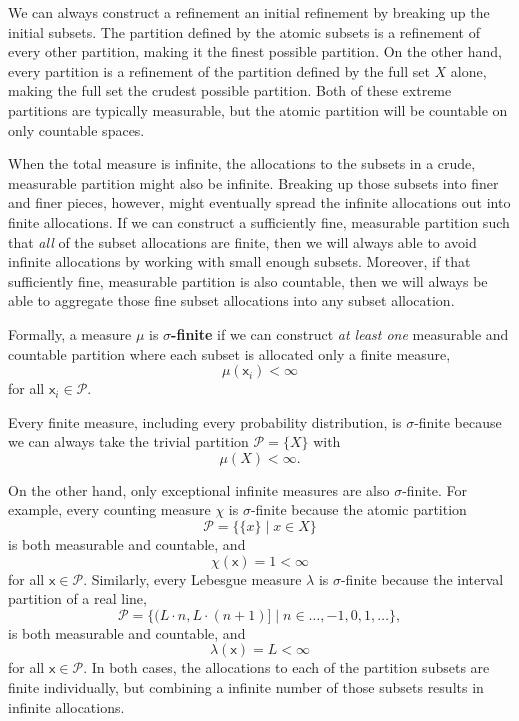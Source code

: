 \documentclass[
  letterpaper,
  DIV=11,
  numbers=noendperiod]{scrartcl}
\begin{document}
We can always construct a refinement an initial refinement by breaking
up the initial subsets. The partition defined by the atomic subsets is a
refinement of every other partition, making it the finest possible
partition. On the other hand, every partition is a refinement of the
partition defined by the full set \(X\) alone, making the full set the
crudest possible partition. Both of these extreme partitions are
typically measurable, but the atomic partition will be countable on only
countable spaces.

When the total measure is infinite, the allocations to the subsets in a
crude, measurable partition might also be infinite. Breaking up those
subsets into finer and finer pieces, however, might eventually spread
the infinite allocations out into finite allocations. If we can
construct a sufficiently fine, measurable partition such that \emph{all}
of the subset allocations are finite, then we will always able to avoid
infinite allocations by working with small enough subsets. Moreover, if
that sufficiently fine, measurable partition is also countable, then we
will always be able to aggregate those fine subset allocations into any
subset allocation.

Formally, a measure \(\mu\) is \textbf{\(\sigma\)-finite} if we can
construct \emph{at least one} measurable and countable partition where
each subset is allocated only a finite measure, \[
\mu(\mathsf{x}_{i}) < \infty
\] for all \(\mathsf{x}_{i} \in \mathcal{P}\).

Every finite measure, including every probability distribution, is
\(\sigma\)-finite because we can always take the trivial partition
\(\mathcal{P} = \{ X \}\) with \[
\mu(X) < \infty.
\]

On the other hand, only exceptional infinite measures are also
\(\sigma\)-finite. For example, every counting measure \(\chi\) is
\(\sigma\)-finite because the atomic partition \[
\mathcal{P} = \{ \{ x \} \mid x \in X \}
\] is both measurable and countable, and \[
\chi( \mathsf{x} ) = 1 < \infty
\] for all \(\mathsf{x} \in \mathcal{P}\). Similarly, every Lebesgue
measure \(\lambda\) is \(\sigma\)-finite because the interval partition
of a real line, \[
\mathcal{P} =
\{
  ( L \cdot n, L \cdot (n + 1) ] \mid
  n \in \ldots, -1, 0, 1, \ldots
\},
\] is both measurable and countable, and \[
\lambda( \mathsf{x} ) = L < \infty
\] for all \(\mathsf{x} \in \mathcal{P}\). In both cases, the
allocations to each of the partition subsets are finite individually,
but combining a infinite number of those subsets results in infinite
allocations.
\end{document}
